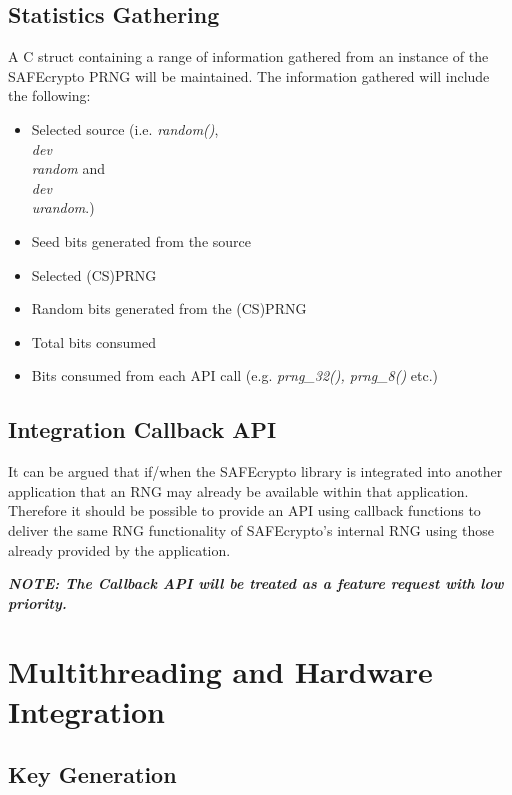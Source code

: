\subsection{Statistics Gathering}

A C struct containing a range of information gathered from an instance of the SAFEcrypto PRNG will be maintained. The information gathered will include the following:

\begin{itemize}
\item Selected source (i.e. \textit{random()}, \textit{\\dev\\random} and \textit{\\dev\\urandom}.)
\item Seed bits generated from the source
\item Selected (CS)PRNG
\item Random bits generated from the (CS)PRNG
\item Total bits consumed
\item Bits consumed from each API call (e.g. \textit{prng\_32(), prng\_8()} etc.)
\end{itemize}

\subsection{Integration Callback API}

It can be argued that if/when the SAFEcrypto library is integrated into another application that an RNG may already be available within that application. Therefore it should be possible to provide an API using callback functions to deliver the same RNG functionality of SAFEcrypto's internal RNG using those already provided by the application.

\textbf{\textit{NOTE: The Callback API will be treated as a feature request with low priority.}}



\section{Multithreading and Hardware Integration}


\subsection{Key Generation}

